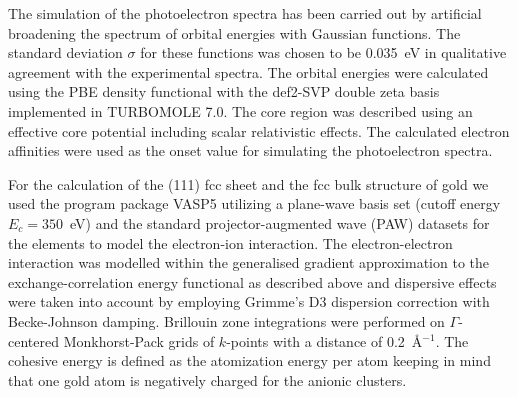 The simulation of the photoelectron spectra has been carried out by artificial
broadening the spectrum of orbital energies with Gaussian functions. The
standard deviation $\sigma$ for these functions was chosen to be 0.035~eV in
qualitative agreement with the experimental spectra. The orbital energies were
calculated using the PBE density functional with the
def2-SVP\autocite{Weigend_Balancedbasissets_2005} double zeta basis implemented
in TURBOMOLE 7.0.\autocite{_TURBOMOLEV72015_} The core region was described
using an effective core potential including scalar relativistic effects.  The
calculated electron affinities were used as the onset value for simulating the
photoelectron spectra. 


For the calculation of the (111) fcc sheet and the fcc bulk structure of gold
we used the program package VASP5\autocite{Kresse_Efficiencyabinitiototal_1996}
utilizing a plane-wave basis set (cutoff energy $E_c=350$~eV) and the standard
projector-augmented wave (PAW) datasets for the elements to model the
electron-ion
interaction\autocite{Blochl_Projectoraugmentedwavemethod_1994,Kresse_ultrasoftpseudopotentialsprojector_1999}.
The electron-electron interaction was modelled within the generalised gradient
approximation to the exchange-correlation energy functional as described above
and dispersive effects were taken into account by employing Grimme's D3
dispersion correction with Becke-Johnson
damping.\autocite{Grimme_consistentaccurateinitio_2010,Grimme_Effectdampingfunction_2011}
Brillouin zone integrations were performed on $\Gamma$-centered Monkhorst-Pack
grids of $k$-points with a distance of 0.2~\AA$^{-1}$.  The cohesive energy is
defined as the atomization energy per atom keeping in mind that one gold atom
is negatively charged for the anionic clusters.

